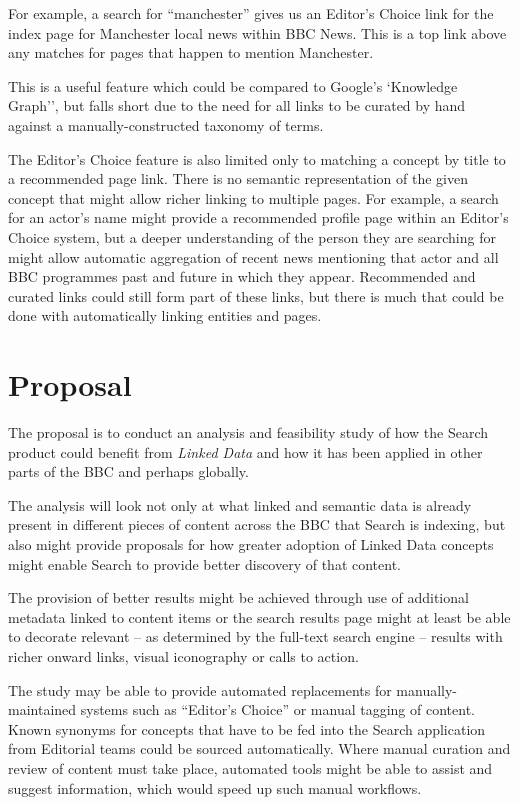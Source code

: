 \documentclass[10pt,a4paper]{article}
\begin{document}
For example, a search for ``manchester'' gives
us an Editor's Choice link for the index page for Manchester local
news within BBC News. This is a top link above any matches for pages
that happen to mention Manchester.

This is a useful feature which could be compared to Google's
`Knowledge Graph'', but falls short due to the need for all links
to be curated by hand against a manually-constructed taxonomy of terms.

The Editor's Choice feature is also limited only to matching a
concept by title to a recommended page link. There is no semantic
representation of the given concept that might allow richer linking
to multiple pages. For example, a search for an actor's name might
provide a recommended profile page within an Editor's Choice system,
but a deeper understanding of the person they are searching for might
allow automatic aggregation of recent news mentioning that actor and
all BBC programmes past and future in which they appear. Recommended
and curated links could still form part of these links, but there
is much that could be done with automatically linking entities and pages.

\section{Proposal}

The proposal is to conduct an analysis and feasibility study of how
the Search product could benefit from \emph{Linked Data} and how
it has been applied in other parts of the BBC and perhaps globally.

The analysis will look not only at what linked and semantic data is already
present in different pieces of content across the BBC that Search is
indexing, but also might provide proposals for how greater adoption
of Linked Data concepts might enable Search to provide better discovery
of that content.

The provision of better results might be achieved through use of additional
metadata linked to content items or the search results page might
at least be able to decorate relevant -- as determined by the
full-text search engine -- results with richer onward links, visual iconography
or calls to action.

The study may be able to provide automated replacements for
manually-maintained systems such as ``Editor's Choice'' or manual
tagging of content. Known synonyms for concepts that have to be fed into
the Search application from Editorial teams could be sourced automatically.
Where manual curation and review of content must take place, automated
tools might be able to assist and suggest information, which would
speed up such manual workflows.
\end{document}
